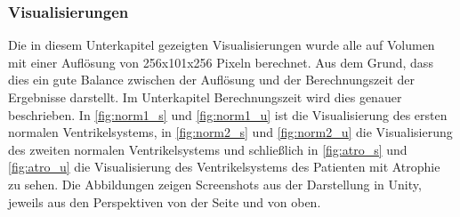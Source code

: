 \subsubsection{Visualisierungen}

Die in diesem Unterkapitel gezeigten Visualisierungen wurde alle auf Volumen mit einer Auflösung von 256x101x256 Pixeln berechnet. Aus dem Grund, dass dies ein gute Balance zwischen der Auflösung und der Berechnungszeit der Ergebnisse darstellt. Im Unterkapitel Berechnungszeit wird dies genauer beschrieben.
\newline
In \autoref{fig:norm1_s} und \autoref{fig:norm1_u} ist die Visualisierung des ersten normalen Ventrikelsystems, in \autoref{fig:norm2_s} und \autoref{fig:norm2_u} die Visualisierung des zweiten normalen Ventrikelsystems und schließlich in \autoref{fig:atro_s} und \autoref{fig:atro_u} die Visualisierung des Ventrikelsystems des Patienten mit Atrophie zu sehen.
\newline
Die Abbildungen zeigen Screenshots aus der Darstellung in Unity, jeweils aus den Perspektiven von der Seite und von oben.

